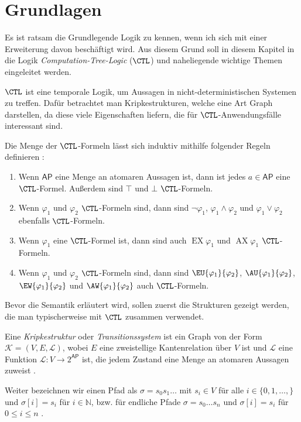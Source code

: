 \section{Grundlagen}
\label{ChapGrundlagen}

Es ist ratsam die Grundlegende Logik zu kennen, wenn ich sich mit einer Erweiterung davon beschäftigt wird. Aus diesem Grund soll in diesem Kapitel in die Logik \textit{Computation-Tree-Logic} ($\CTL$) und naheliegende wichtige Themen eingeleitet werden.

$\CTL$ ist eine temporale Logik, um Aussagen in nicht-deterministischen Systemen zu treffen. 
Dafür betrachtet man Kripkestrukturen, welche eine Art Graph darstellen, da diese viele Eigenschaften liefern, die für $\CTL$-Anwendungsfälle interessant sind.

\begin{definition}
	Die Menge der $\CTL$-Formeln lässt sich induktiv mithilfe folgender Regeln definieren \cite{clarke1982design, baier2008principles}:
	\begin{enumerate}
		\item Wenn $\mathsf{AP}$ eine Menge an atomaren Aussagen ist, dann ist jedes $a\in \mathsf{AP}$ eine $\CTL$-Formel. Außerdem sind $\top$ und $\bot$ $\CTL$-Formeln.
		\item Wenn $\varphi_1$ und $\varphi_2$ $\CTL$-Formeln sind, dann sind $\neg\varphi_1$, $\varphi_1 \land \varphi_2$ und $\varphi_1 \lor \varphi_2$ ebenfalls $\CTL$-Formeln.
		\item Wenn $\varphi_1$ eine $\CTL$-Formel ist, dann sind auch $\operatorname{EX}\varphi_1$ und $\operatorname{AX}\varphi_1$ $\CTL$-Formeln.
		\item Wenn $\varphi_1$ und $\varphi_2$ $\CTL$-Formeln sind, dann sind $\EU{\varphi_1}{\varphi_2}$, $\AU{\varphi_1}{\varphi_2}$, $\EW{\varphi_1}{\varphi_2}$ und $\AW{\varphi_1}{\varphi_2}$ auch $\CTL$-Formeln.
	\end{enumerate}
\end{definition}

Bevor die Semantik erläutert wird, sollen zuerst die Strukturen gezeigt werden, die man typischerweise mit $\CTL$ zusammen verwendet.

\begin{definition}[Kripkestrukturen]
	\label{DefKripkeStruk}
	Eine \textit{Kripkestruktur} oder \textit{Transitionssystem} ist ein Graph von der Form $\mathcal{K}=(V, E, \mathcal{L})$, wobei $E$ eine zweistellige Kantenrelation über $V$ ist und $\mathcal{L}$ eine Funktion $\mathcal{L}:V\to2^{\mathsf{AP}}$ ist, die jedem Zustand eine Menge an atomaren Aussagen zuweist 	\cite{clarke1982design,clarke1986automatic}.
	
	Weiter bezeichnen wir einen Pfad als $\sigma=s_0 s_1 \dots$ mit $s_i\in V$ für alle $i\in\{0, 1,\dots,\}$ und $\sigma[i]=s_i$ für $i\in \mathbb{N}$, bzw. für endliche Pfade $\sigma = s_0 \dots s_n$ und $\sigma[i] = s_i$ für $0\leq i \leq n$ \cite{baier2008principles}.
\end{definition}

